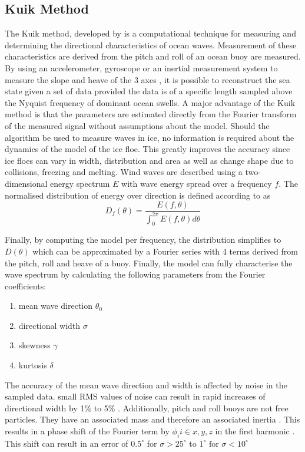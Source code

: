 \subsection{Kuik Method}
\label{kuik}
The Kuik method, developed by \textcite{kuik1988method} is a computational technique for measuring and determining the directional characteristics of ocean waves. Measurement of these characteristics are derived from the pitch and roll of an ocean buoy are measured. By using an accelerometer, gyroscope or an inertial measurement system to measure the slope and heave of the 3 axes \cite{kuik1988method}, it is possible to reconstruct the sea state given a set of data provided the data is of a specific length sampled above the Nyquist frequency of dominant ocean swells. A major advantage of the Kuik method is that the parameters are estimated directly from the Fourier transform of the measured signal \cite{kuik1988method} without assumptions about the model. Should the algorithm be used to measure waves in ice, no information is required about the dynamics of the model of the ice floe. This greatly improves the accuracy since ice floes can vary in width, distribution and area as well as change shape due to collisions, freezing and melting. Wind waves are described using a two-dimensional energy spectrum $E$ with wave energy spread over a frequency $f$. The normalised distribution of energy over direction is defined according to \textcite{kuik1988method} as
\begin{equation}
	D_f(\theta) = \frac{E(f,\theta)}{\int_0^{2
			\pi}E(f,\theta)d\theta}
\end{equation} 

Finally, by computing the model per frequency, the distribution simplifies to $D(\theta)$ which can be approximated by a Fourier series with 4 terms \cite{kuik1988method} derived from the pitch, roll and heave of a buoy. Finally, the model can fully characterise the wave spectrum by calculating the following parameters from the Fourier coefficients:

\begin{enumerate}
	\item mean wave direction $\theta_0$
	\item directional width $\sigma$
	\item skewness $\gamma$
	\item kurtosis $\delta$ 
\end{enumerate}

The accuracy of the mean wave direction and width is affected by noise in the sampled data. small RMS values of noise can result in rapid increases of directional width by 1\% to 5\% \cite{kuik1988method}. Additionally, pitch and roll buoys are not free particles. They have an associated mass and therefore an associated inertia \cite{kuik1988method}. This results in a phase shift of the Fourier term by $\phi_i i \in {x,y,z}$  in the first harmonic \cite{kuik1988method}. This shift can result in an error of $0.5^\circ $ for $\sigma > 25 ^\circ $ to $1^\circ \text{ for } \sigma < 10^\circ $ \cite{kuik1988method}   

